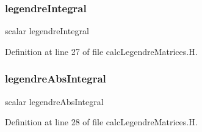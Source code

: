 \subsubsection{\texorpdfstring{legendre\+Integral}{legendreIntegral}}
{\footnotesize\ttfamily scalar legendre\+Integral}



Definition at line 27 of file calc\+Legendre\+Matrices.\+H.

\mbox{\label{calcLegendreMatrices_8H_a5e15e45be3e658edaaf221dcddb6d766}} 
\subsubsection{\texorpdfstring{legendre\+Abs\+Integral}{legendreAbsIntegral}}
{\footnotesize\ttfamily scalar legendre\+Abs\+Integral}



Definition at line 28 of file calc\+Legendre\+Matrices.\+H.

